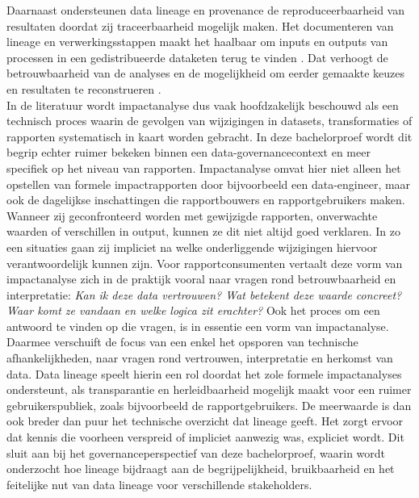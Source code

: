 Daarnaast ondersteunen data lineage en provenance de reproduceerbaarheid van resultaten doordat zij traceerbaarheid mogelijk maken. Het documenteren van lineage en verwerkingsstappen maakt het haalbaar om inputs en outputs van processen in een gedistribueerde dataketen terug te vinden \autocite{wittnerlightweight}. Dat verhoogt de betrouwbaarheid van de analyses en de mogelijkheid om eerder gemaakte keuzes en resultaten te reconstrueren \autocite{verma2024tracing}.\\

In de literatuur wordt impactanalyse dus vaak hoofdzakelijk beschouwd als een technisch proces waarin de gevolgen van wijzigingen in datasets, transformaties of rapporten systematisch in kaart worden gebracht.\autocite{kretsou2021change,malviya2025dbt} In deze bachelorproef wordt dit begrip echter ruimer bekeken binnen een data-gover\-nance\-context en meer specifiek op het niveau van rapporten. Impactanalyse omvat hier niet alleen het opstellen van formele impactrapporten door bijvoorbeeld een data-engineer, maar ook de dagelijkse inschattingen die rapportbouwers en rapportgebruikers maken. Wanneer zij geconfronteerd worden met gewijzigde rapporten, onverwachte waarden of verschillen in output, kunnen ze dit niet altijd goed verklaren. In zo een situaties gaan zij impliciet na welke onderliggende wijzigingen hiervoor verantwoordelijk kunnen zijn. Voor rapportconsumenten vertaalt deze vorm van impactanalyse zich in de praktijk vooral naar vragen rond betrouwbaarheid en interpretatie: \textit{Kan ik deze data vertrouwen? Wat betekent deze waarde concreet? Waar komt ze vandaan en welke logica zit erachter?} Ook het proces om een antwoord te vinden op die vragen, is in essentie een vorm van impactanalyse.\\

Daarmee verschuift de focus van een enkel het opsporen van technische afhankelijkheden, naar vragen rond vertrouwen, interpretatie en herkomst van data. Data lineage speelt hierin een rol doordat het zole formele impactanalyses ondersteunt, als transparantie en herleidbaarheid mogelijk maakt voor een ruimer gebruikerspubliek, zoals bijvoorbeeld de rapportgebruikers. De meerwaarde is dan ook breder dan puur het technische overzicht dat lineage geeft. Het zorgt ervoor dat kennis die voorheen verspreid of impliciet aanwezig was, expliciet wordt. Dit sluit aan bij het governanceperspectief van deze bachelorproef, waarin wordt onderzocht hoe lineage bijdraagt aan de begrijpelijkheid, bruikbaarheid en het feitelijke nut van data lineage voor verschillende stakeholders.\\

